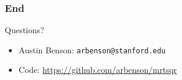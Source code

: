 \documentclass{beamer}
\begin{document}
\begin{frame}
\frametitle{End}

Questions?

\vspace{0.2in}

\begin{itemize}
\setlength{\itemsep}{0.1in}
\item Austin Benson: \texttt{arbenson@stanford.edu}
\item Code: \url{https://github.com/arbenson/mrtsqr}
\end{itemize}

\end{frame}
\end{document}
